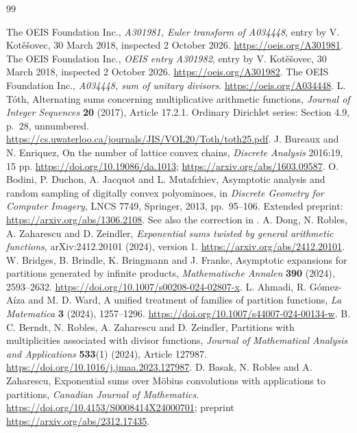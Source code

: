 \documentclass[11pt]{article}
\theoremstyle{remark}\newtheorem{remark}[theorem]{Remark}
\numberwithin{equation}{section}
\begin{document}
\begin{thebibliography}{99}\small\raggedright
{} The OEIS Foundation Inc., \emph{A301981, Euler transform of A034448}, entry by V. Kot\v{e}\v{s}ovec, 30 March 2018, inspected 2 October 2026. \url{https://oeis.org/A301981}.
 The OEIS Foundation Inc., \emph{OEIS entry A301982}, entry by V. Kot\v{e}\v{s}ovec, 30 March 2018, inspected 2 October 2026. \url{https://oeis.org/A301982}.
 The OEIS Foundation Inc., \emph{A034448, sum of unitary divisors}. \url{https://oeis.org/A034448}.
 L. T\'oth, Alternating sums concerning multiplicative arithmetic functions, \emph{Journal of Integer Sequences} \textbf{20} (2017), Article 17.2.1. Ordinary Dirichlet series: Section 4.9, p.~28, unnumbered. \url{https://cs.uwaterloo.ca/journals/JIS/VOL20/Toth/toth25.pdf}.
 J. Bureaux and N. Enriquez, On the number of lattice convex chains, \emph{Discrete Analysis} 2016:19, 15 pp. \url{https://doi.org/10.19086/da.1013}; \url{https://arxiv.org/abs/1603.09587}.
 O. Bodini, P. Duchon, A. Jacquot and L. Mutafchiev, Asymptotic analysis and random sampling of digitally convex polyominoes, in \emph{Discrete Geometry for Computer Imagery}, LNCS 7749, Springer, 2013, pp.~95--106. Extended preprint: \url{https://arxiv.org/abs/1306.2108}. See also the correction in \cite[Section 4.2]{bureaux}.
 A. Dong, N. Robles, A. Zaharescu and D. Zeindler, \emph{Exponential sums twisted by general arithmetic functions}, arXiv:2412.20101 (2024), version 1. \url{https://arxiv.org/abs/2412.20101}.
 W. Bridges, B. Brindle, K. Bringmann and J. Franke, Asymptotic expansions for partitions generated by infinite products, \emph{Mathematische Annalen} \textbf{390} (2024), 2593--2632. \url{https://doi.org/10.1007/s00208-024-02807-x}.
 L. Ahmadi, R. G\'omez-A\'iza and M. D. Ward, A unified treatment of families of partition functions, \emph{La Matematica} \textbf{3} (2024), 1257--1296. \url{https://doi.org/10.1007/s44007-024-00134-w}.
 B. C. Berndt, N. Robles, A. Zaharescu and D. Zeindler, Partitions with multiplicities associated with divisor functions, \emph{Journal of Mathematical Analysis and Applications} \textbf{533}(1) (2024), Article 127987. \url{https://doi.org/10.1016/j.jmaa.2023.127987}.
 D. Basak, N. Robles and A. Zaharescu, Exponential sums over M\"obius convolutions with applications to partitions, \emph{Canadian Journal of Mathematics}. \url{https://doi.org/10.4153/S0008414X24000701}; preprint \url{https://arxiv.org/abs/2312.17435}.

\end{thebibliography}
\end{document}
